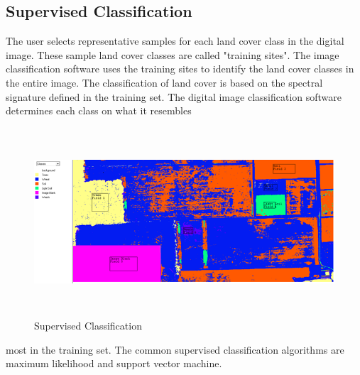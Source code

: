 \documentclass[document.tex]{subfiles}
\begin{document}
\subsection{Supervised Classification}
\noindent The user selects representative samples for each land cover class in the digital image.
These sample land cover classes are called "training sites". The image classification
software uses the training sites to identify the land cover classes in the entire image.
The classification of land cover is based on the spectral signature defined in the training set. The digital image classification software determines each class on what it resembles
\begin{figure}[H]
	\begin{center}
		\includegraphics[height=7.0cm]{imgs/Supervised.png}
	\end{center}
	\caption{Supervised Classification}
	\label{fig: Supervised Classification}
\end{figure}
most in the training set. The common supervised classification algorithms are maximum
likelihood\cite{19} and support vector machine\cite{18}.
\end{document}
